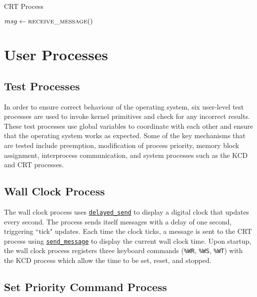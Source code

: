 \documentclass[12pt]{report}
\begin{document}
\begin{algorithm}
\caption{CRT Process}
\label{alg:crtprocess}
\begin{algorithmic}[1]
        \State $msg \leftarrow \Call{receive\_message}{\null}$
            \State {}
        \Else
            \State {}
        \EndIf
    \EndWhile
\EndProcedure
\end{algorithmic}
\end{algorithm}

\section{User Processes}

\subsection{Test Processes}
\label{subsec:testprocesses}

In order to ensure correct behaviour of the operating system, six user-­level test processes are used to invoke kernel primitives and check for any incorrect results. These test processes use global variables to coordinate with each other and ensure that the operating system works as expected. Some of the key mechanisms that are tested include preemption, modification of process priority, memory block assignment, interprocess communication, and system processes such as the KCD and CRT processes.

\subsection{Wall Clock Process}

The wall clock process uses \hyperref[alg:sendingdelayedmessages]{\texttt{delayed_send}} to display a digital clock that updates every second. The process sends itself messages with a delay of one second,
triggering ``tick" updates. Each time the clock ticks, a message is sent to the CRT process using \hyperref[alg:sendingmessages]{\texttt{send_message}} to display the current wall clock time. Upon startup, the wall clock process registers three keyboard commands (\texttt{\%WR}, \texttt{\%WS}, \texttt{\%WT}) with the KCD process which allow the time to be set, reset, and stopped.

\subsection{Set Priority Command Process}
\end{document}

